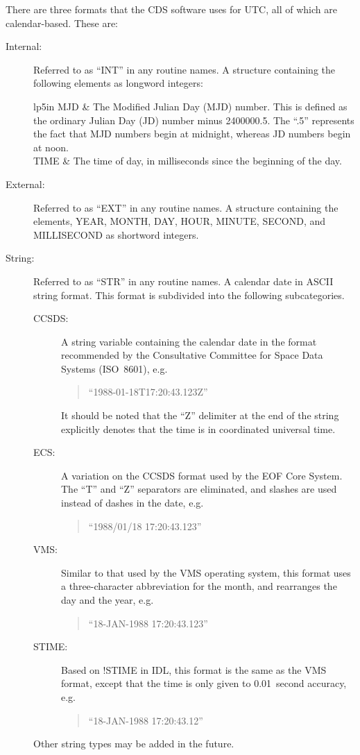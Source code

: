 There are three formats that the CDS software uses for UTC, all of which are
calendar-based.  These are:
\begin{description}
\item[Internal:]
Referred to as ``INT'' in any routine names.  A structure containing the
following elements as longword integers:
\begin{quotetable}{lp{5in}}
MJD	&	The Modified Julian Day (MJD) number.  This is defined as the
		ordinary Julian Day (JD) number minus 2400000.5.  The ``.5''
		represents the fact that MJD numbers begin at midnight, whereas
		JD numbers begin at noon.\\
TIME	&	The time of day, in milliseconds since the beginning of the
		day.\\
\end{quotetable}
\item[External:]
Referred to as ``EXT'' in any routine names.  A structure containing the
elements, YEAR, MONTH, DAY, HOUR, MINUTE, SECOND, and MILLISECOND as shortword
integers.
\item[String:]
Referred to as ``STR'' in any routine names.  A calendar date in ASCII string
format.  This format is subdivided into the following subcategories.
\begin{description}
\item[CCSDS:]
A string variable containing the calendar date in the format recommended by the
Consultative Committee for Space Data Systems (ISO~8601), e.g.
\begin{quote}
``1988-01-18T17:20:43.123Z''
\end{quote}
It should be noted that the ``Z'' delimiter at the end of the string explicitly
denotes that the time is in coordinated universal time.
\item[ECS:]
A variation on the CCSDS format used by the EOF Core System.  The ``T'' and
``Z'' separators are eliminated, and slashes are used instead of dashes in the
date, e.g.
\begin{quote}
``1988/01/18 17:20:43.123''
\end{quote}
\item[VMS:]  Similar to that used by the VMS operating system, this format uses
a three-character abbreviation for the month, and rearranges the day and the
year, e.g.
\begin{quote}
``18-JAN-1988 17:20:43.123''
\end{quote}
\item[STIME:]  Based on !STIME in IDL, this format is the same as the VMS
format, except that the time is only given to 0.01~second accuracy, e.g.
\begin{quote}
``18-JAN-1988 17:20:43.12''
\end{quote}
\end{description}
Other string types may be added in the future.
\end{description}

